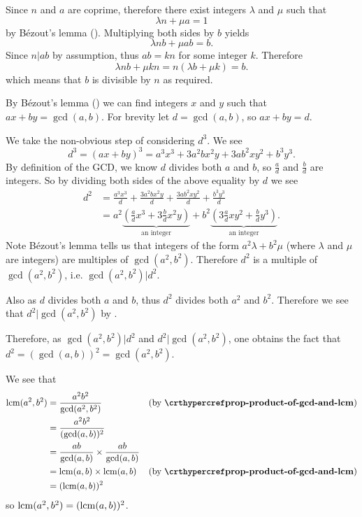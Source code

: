 \begin{questions}
    \item Since $n$ and $a$ are coprime, therefore there exist integers $\lambda$ and $\mu$ such that
    \[
        \lambda n + \mu a = 1
    \]
    by B\'ezout's lemma (). Multiplying both sides by $b$ yields
    \[
        \lambda nb + \mu ab = b.
    \]
    Since $n \vert ab$ by assumption, thus $ab = kn$ for some integer $k$. Therefore
    \[
        \lambda nb + \mu kn = n(\lambda b + \mu k) = b.
    \]
    which means that $b$ is divisible by $n$ as required.

    \item \begin{partquestions}{\roman*}
        \item By B\'{e}zout's lemma () we can find integers $x$ and $y$ such that $ax + by = \gcd(a, b)$. For brevity let $d = \gcd(a,b)$, so $ax+by=d$.

        We take the non-obvious step of considering $d^3$. We see
        \[
            d^3 = (ax+by)^3 = a^3x^3 + 3a^2bx^2y + 3ab^2xy^2 + b^3y^3.
        \]
        By definition of the GCD, we know $d$ divides both $a$ and $b$, so $\frac ad$ and $\frac bd$ are integers. So by dividing both sides of the above equality by $d$ we see
        \begin{align*}
            d^2 &= \frac{a^3x^3}{d} + \frac{3a^2bx^2y}{d} + \frac{3ab^2xy^2}{d} + \frac{b^3y^3}{d}\\
            &= a^2\underbrace{\left(\frac{a}{d}x^3 + 3\frac{b}{d}x^2y\right)}_{\text{an integer}} + b^2\underbrace{\left(3\frac{a}{d}xy^2 + \frac{b}{d}y^3\right)}_{\text{an integer}}.
        \end{align*}
        Note B\'{e}zout's lemma tells us that integers of the form $a^2\lambda + b^2\mu$ (where $\lambda$ and $\mu$ are integers) are multiples of $\gcd(a^2, b^2)$. Therefore $d^2$ is a multiple of $\gcd(a^2, b^2)$, i.e. $\gcd(a^2, b^2) \vert d^2$.

        Also as $d$ divides both $a$ and $b$, thus $d^2$ divides both $a^2$ and $b^2$. Therefore we see that $d^2 \vert \gcd(a^2, b^2)$ by .

        Therefore, as $\gcd(a^2, b^2) \vert d^2$ and $d^2 \vert \gcd(a^2, b^2)$, one obtains the fact that $d^2 = (\gcd(a,b))^2 = \gcd(a^2, b^2)$.

        \item We see that
        \begin{align*}
            \lcm(a^2,b^2) &= \frac{a^2b^2}{\gcd(a^2,b^2)} & (\text{by } \myref{prop-product-of-gcd-and-lcm})\\
            &= \frac{a^2b^2}{(\gcd(a,b))^2}\\
            &= \frac{ab}{\gcd(a,b)} \times \frac{ab}{\gcd(a,b)}\\
            &= \lcm(a,b) \times \lcm(a,b) & (\text{by } \myref{prop-product-of-gcd-and-lcm})\\
            &= (\lcm(a,b))^2
        \end{align*}
        so $\mathrm{lcm}(a^2,b^2) = (\mathrm{lcm}(a,b))^2$.
    \end{partquestions}
\end{questions}
